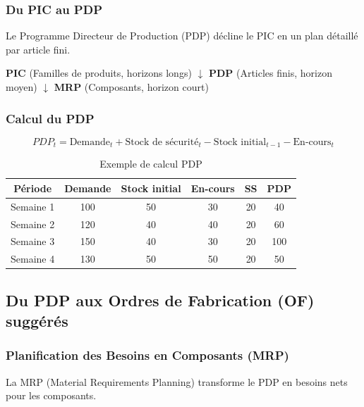 \documentclass{article}
\begin{document}
\begin{table}[h]
\subsubsection{Du PIC au PDP}

Le Programme Directeur de Production (PDP) décline le PIC en un plan détaillé par article fini.

\begin{tcolorbox}[colback=vertclair, colframe=green!50!black, title=Articulation PIC - PDP]
\begin{center}
\textbf{PIC} (Familles de produits, horizons longs)
$\downarrow$ 
\textbf{PDP} (Articles finis, horizon moyen)
$\downarrow$ 
\textbf{MRP} (Composants, horizon court)
\end{center}
\end{tcolorbox}

\subsubsection{Calcul du PDP}

\[
PDP_t = \text{Demande}_t + \text{Stock de sécurité}_t - \text{Stock initial}_{t-1} - \text{En-cours}_t
\]

\begin{table}[h]
\centering
\begin{tabular}{|c|c|c|c|c|c|}
\hline
\textbf{Période} & \textbf{Demande} & \textbf{Stock initial} & \textbf{En-cours} & \textbf{SS} & \textbf{PDP} \\
\hline
Semaine 1 & 100 & 50 & 30 & 20 & 40 \\
Semaine 2 & 120 & 40 & 40 & 20 & 60 \\
Semaine 3 & 150 & 40 & 30 & 20 & 100 \\
Semaine 4 & 130 & 50 & 50 & 20 & 50 \\
\hline
\end{tabular}
\caption{Exemple de calcul PDP}
\end{table}

\subsection{Du PDP aux Ordres de Fabrication (OF) suggérés}

\subsubsection{Planification des Besoins en Composants (MRP)}

La MRP (Material Requirements Planning) transforme le PDP en besoins nets pour les composants.


\end{table}
\end{document}
